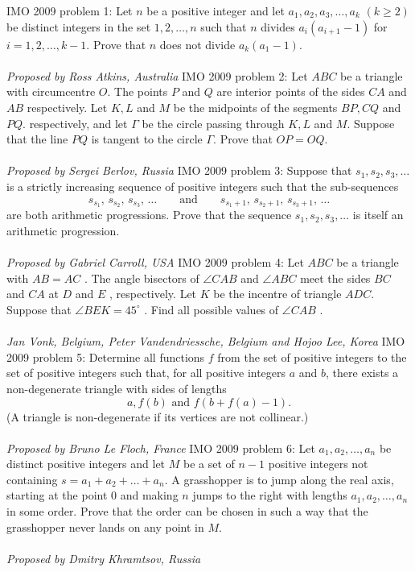 IMO 2009 problem 1:  Let $ n$ be a positive integer and let $ a_1,a_2,a_3,\ldots,a_k$ $ ( k\ge 2)$ be distinct integers in the set $ { 1,2,\ldots,n}$ such that $ n$ divides $ a_i(a_{i + 1} - 1)$ for $ i = 1,2,\ldots,k - 1$. Prove that $ n$ does not divide $ a_k(a_1 - 1).$ \\\\
\textit{Proposed by Ross Atkins, Australia } 
IMO 2009 problem 2:  Let $ ABC$ be a triangle with circumcentre $ O$. The points $ P$ and $ Q$ are interior points of the sides $ CA$ and $ AB$ respectively. Let $ K,L$ and $ M$ be the midpoints of the segments $ BP,CQ$ and $ PQ$. respectively, and let $ \Gamma$ be the circle passing through $ K,L$ and $ M$. Suppose that the line $ PQ$ is tangent to the circle $ \Gamma$. Prove that $ OP = OQ.$ \\\\
\textit{Proposed by Sergei Berlov, Russia } 
IMO 2009 problem 3:  Suppose that $ s_1,s_2,s_3, \ldots$ is a strictly increasing sequence of positive integers such that the sub-sequences
\[
s_{s_1},\, s_{s_2},\, s_{s_3},\, \ldots\qquad\text{and}\qquad s_{s_1+1},\, s_{s_2+1},\, s_{s_3+1},\, \ldots
\]
are both arithmetic progressions. Prove that the sequence $ s_1, s_2, s_3, \ldots$ is itself an arithmetic progression. \\\\
\textit{Proposed by Gabriel Carroll, USA} 
IMO 2009 problem 4:  Let $ ABC$ be a triangle with $ AB = AC$ . The angle bisectors of $ \angle C AB$ and $ \angle AB C$ meet the sides $ B C$ and $ C A$ at $ D$ and $ E$ , respectively. Let $ K$ be the incentre of triangle $ ADC$. Suppose that $ \angle B E K = 45^\circ$ . Find all possible values of $ \angle C AB$ . \\\\
\textit{Jan Vonk, Belgium, Peter Vandendriessche, Belgium and Hojoo Lee, Korea } 
IMO 2009 problem 5:  Determine all functions $ f$ from the set of positive integers to the set of positive integers such that, for all positive integers $ a$ and $ b$, there exists a non-degenerate triangle with sides of lengths
\[ a, f(b) \text{ and } f(b + f(a) - 1). \]
(A triangle is non-degenerate if its vertices are not collinear.) \\\\
\textit{Proposed by Bruno Le Floch, France} 
IMO 2009 problem 6:  Let $ a_1, a_2, \ldots , a_n$ be distinct positive integers and let $ M$ be a set of $ n - 1$ positive integers not containing $ s = a_1 + a_2 + \ldots + a_n.$ A grasshopper is to jump along the real axis, starting at the point $ 0$ and making $ n$ jumps to the right with lengths $ a_1, a_2, \ldots , a_n$ in some order. Prove that the order can be chosen in such a way that the grasshopper never lands on any point in $ M.$ \\\\
\textit{Proposed by Dmitry Khramtsov, Russia} 


